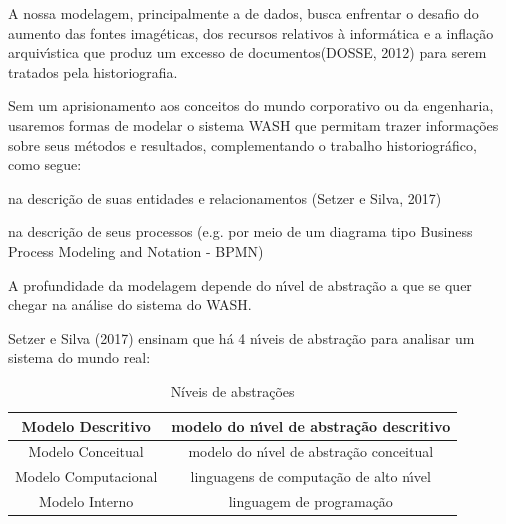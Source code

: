 \documentclass[
12pt,		%
openright,	%
twoside,  %
a4paper,			%
chapter=TITLE,		%
english,			%
french,				%
spanish,			%
brazil				%
]{USPSC-classe/USPSC}
\begin{document}
A nossa modelagem, principalmente a de dados, busca enfrentar o desafio do \textquotedbl aumento das fontes imag\'eticas, dos recursos relativos \`a inform\'atica e a infla\c{c}\~ao arquiv\'{\i}stica que produz um excesso de documentos\textquotedbl   (DOSSE, 2012) para serem tratados pela historiografia.









Sem um aprisionamento aos conceitos do mundo corporativo ou da engenharia, usaremos formas de modelar o sistema WASH que permitam trazer informa\c{c}\~oes sobre seus m\'etodos e resultados, complementando o trabalho historiogr\'afico, como segue:










\begin{alineas}
\item na descri\c{c}\~ao de suas entidades e relacionamentos (Setzer e Silva, 2017)
\item na descri\c{c}\~ao de seus processos (e.g. por meio de um diagrama tipo Business Process Modeling and Notation - BPMN)
\end{alineas}

A profundidade da modelagem depende do n\'{\i}vel de abstra\c{c}\~ao a que se quer chegar na an\'alise do sistema do WASH.









Setzer e Silva (2017) ensinam que h\'a 4 n\'{\i}veis de abstra\c{c}\~ao para analisar um sistema do mundo real:













\begin{table}[htb]
\tiny
\caption{\label{98b39a827ce08562e7aeba26851f8d86d1af7179}N\'{i}veis de abstra\c{c}\~oes}

\centering
\begin{tabular}{|c|c|}
\hline
Modelo Descritivo  &  modelo do n\'{\i}vel de abstra\c{c}\~ao descritivo \\
\hline
Modelo Conceitual  &  modelo do n\'{\i}vel de abstra\c{c}\~ao conceitual \\
\hline
Modelo Computacional  &  linguagens de computa\c{c}\~ao de alto n\'{\i}vel \\
\hline
Modelo Interno  &  linguagem de programa\c{c}\~ao \\
\hline
\end{tabular}
\end{table}
\end{document}
